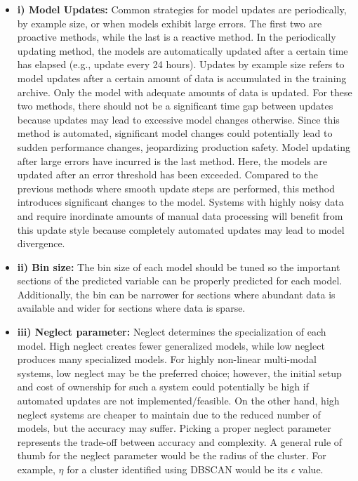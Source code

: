 \begin{itemize}
    \item \textbf{i) Model Updates: } Common strategies for model updates are periodically, by example size, or when models exhibit large errors.  The first two are proactive methods, while the last is a reactive method.  In the periodically updating method, the models are automatically updated after a certain time has elapsed (e.g., update every 24 hours). Updates by example size refers to model updates after a certain amount of data is accumulated in the training archive. Only the model with adequate amounts of data is updated. For these two methods, there should not be a significant time gap between updates because updates may lead to excessive model changes otherwise.  Since this method is automated, significant model changes could potentially lead to sudden performance changes, jeopardizing production safety.  Model updating after large errors have incurred is the last method.  Here, the models are updated after an error threshold has been exceeded.  Compared to the previous methods where smooth update steps are performed, this method introduces significant changes to the model. Systems with highly noisy data and require inordinate amounts of manual data processing will benefit from this update style because completely automated updates may lead to model divergence.

    \item \textbf{ii) Bin size: } The bin size of each model should be tuned so the important sections  of the predicted variable can be properly predicted for each model. Additionally, the bin can be narrower for sections where abundant data is available and wider for sections where data is sparse.
    
    \item \textbf{iii) Neglect parameter: } Neglect determines the specialization of each model.  High neglect creates fewer generalized models, while low neglect produces many specialized models.  For highly non-linear multi-modal systems, low neglect may be the preferred choice; however, the initial setup and cost of ownership for such a system could potentially be high if automated updates are not implemented/feasible. On the other hand, high neglect systems are cheaper to maintain due to the reduced number of models, but the accuracy may suffer.  Picking a proper neglect parameter represents the trade-off between accuracy and complexity.  A general rule of thumb for the neglect parameter would be the radius of the cluster.  For example, $\eta$ for a cluster identified using DBSCAN would be its $\epsilon$ value.
    

\end{itemize}
